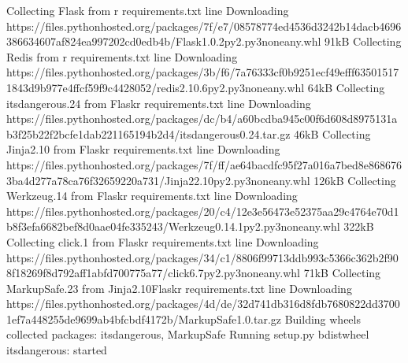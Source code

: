 \documentclass[letterpaper,10pt,english]{sphinxmanual}
\begin{document}
\begin{sphinxVerbatim}[commandchars=\\\{\}]
Collecting Flask from \PYGZhy{}r requirements.txt line 
Downloading https://files.pythonhosted.org/packages/7f/e7/08578774ed4536d3242b14dacb4696386634607af824ea997202cd0edb4b/Flask\PYGZhy{}1.0.2\PYGZhy{}py2.py3\PYGZhy{}none\PYGZhy{}any.whl 91kB
Collecting Redis from \PYGZhy{}r requirements.txt line 
Downloading https://files.pythonhosted.org/packages/3b/f6/7a76333cf0b9251ecf49efff635015171843d9b977e4ffcf59f9c4428052/redis\PYGZhy{}2.10.6\PYGZhy{}py2.py3\PYGZhy{}none\PYGZhy{}any.whl 64kB
Collecting itsdangerous\PYGZgt{}.24 from Flask\PYGZhy{}\PYGZgt{}\PYGZhy{}r requirements.txt line 
Downloading https://files.pythonhosted.org/packages/dc/b4/a60bcdba945c00f6d608d8975131ab3f25b22f2bcfe1dab221165194b2d4/itsdangerous\PYGZhy{}0.24.tar.gz 46kB
Collecting Jinja2\PYGZgt{}.10 from Flask\PYGZhy{}\PYGZgt{}\PYGZhy{}r requirements.txt line 
Downloading https://files.pythonhosted.org/packages/7f/ff/ae64bacdfc95f27a016a7bed8e8686763ba4d277a78ca76f32659220a731/Jinja2\PYGZhy{}2.10\PYGZhy{}py2.py3\PYGZhy{}none\PYGZhy{}any.whl 126kB
Collecting Werkzeug\PYGZgt{}.14 from Flask\PYGZhy{}\PYGZgt{}\PYGZhy{}r requirements.txt line 
Downloading https://files.pythonhosted.org/packages/20/c4/12e3e56473e52375aa29c4764e70d1b8f3efa6682bef8d0aae04fe335243/Werkzeug\PYGZhy{}0.14.1\PYGZhy{}py2.py3\PYGZhy{}none\PYGZhy{}any.whl 322kB
Collecting click\PYGZgt{}.1 from Flask\PYGZhy{}\PYGZgt{}\PYGZhy{}r requirements.txt line 
Downloading https://files.pythonhosted.org/packages/34/c1/8806f99713ddb993c5366c362b2f908f18269f8d792aff1abfd700775a77/click\PYGZhy{}6.7\PYGZhy{}py2.py3\PYGZhy{}none\PYGZhy{}any.whl 71kB
Collecting MarkupSafe\PYGZgt{}.23 from Jinja2\PYGZgt{}.10\PYGZhy{}\PYGZgt{}Flask\PYGZhy{}\PYGZgt{}\PYGZhy{}r requirements.txt line 
Downloading https://files.pythonhosted.org/packages/4d/de/32d741db316d8fdb7680822dd37001ef7a448255de9699ab4bfcbdf4172b/MarkupSafe\PYGZhy{}1.0.tar.gz
Building wheels  collected packages: itsdangerous, MarkupSafe
Running setup.py bdist\PYGZus{}wheel  itsdangerous: started

\end{sphinxVerbatim}
\end{document}
